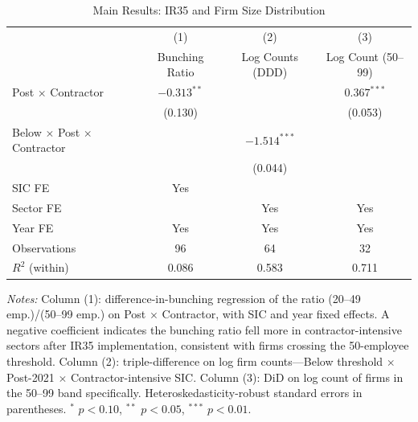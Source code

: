 \begin{table}[htbp]
\centering
\caption{Main Results: IR35 and Firm Size Distribution}
\label{tab:main}
\begin{tabular}{lccc}
\hline\hline
 & (1) & (2) & (3) \\
 & Bunching Ratio & Log Counts (DDD) & Log Count (50--99) \\
\hline
Post $\times$ Contractor & $-0.313^{**}$ & & $0.367^{***}$ \\
 & (0.130) & & (0.053) \\[6pt]
Below $\times$ Post $\times$ Contractor & & $-1.514^{***}$ & \\
 & & (0.044) & \\[6pt]
\hline
SIC FE & Yes & & \\
Sector FE & & Yes & Yes \\
Year FE & Yes & Yes & Yes \\
Observations & 96 & 64 & 32 \\
$R^2$ (within) & 0.086 & 0.583 & 0.711 \\
\hline\hline
\end{tabular}
\begin{tablenotes}
\item \textit{Notes:} Column (1): difference-in-bunching regression of the ratio (20--49 emp.)/(50--99 emp.) on Post $\times$ Contractor, with SIC and year fixed effects. A negative coefficient indicates the bunching ratio fell more in contractor-intensive sectors after IR35 implementation, consistent with firms crossing the 50-employee threshold. Column (2): triple-difference on log firm counts---Below threshold $\times$ Post-2021 $\times$ Contractor-intensive SIC. Column (3): DiD on log count of firms in the 50--99 band specifically. Heteroskedasticity-robust standard errors in parentheses. $^{*}$ $p<0.10$, $^{**}$ $p<0.05$, $^{***}$ $p<0.01$.
\end{tablenotes}
\end{table}
